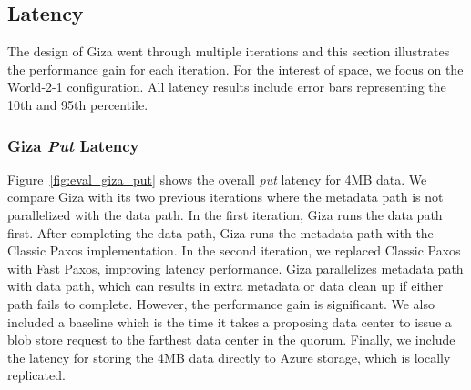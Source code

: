 

\subsection{\name Latency}

The design of Giza went through multiple iterations and this section illustrates
the performance gain for each iteration. For the interest of space, we focus on
the World-2-1 configuration. All latency results include error bars representing
the 10th and 95th percentile.

\subsubsection{Giza {\em Put} Latency}


Figure~\ref{fig:eval_giza_put} shows the \name overall {\em put} latency for 4MB
data. We compare Giza with its two previous iterations where the metadata path
is not parallelized with the data path. In the first iteration, Giza runs the
data path first. After completing the data path, Giza runs the metadata path
with the Classic Paxos implementation. In the second iteration, we replaced
Classic Paxos with Fast Paxos, improving latency performance. Giza parallelizes
metadata path with data path, which can results in extra metadata or data clean
up if either path fails to complete. However, the performance gain is
significant. We also included a baseline which is the time it takes a proposing
data center to issue a blob store request to the farthest data center in the
quorum. Finally, we include the latency for storing the 4MB data directly to
Azure storage, which is locally replicated.

